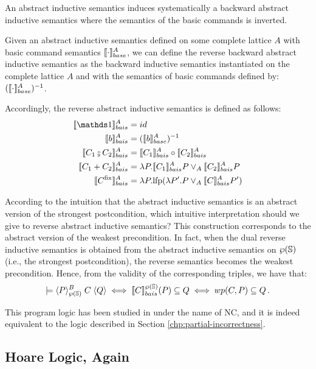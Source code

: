 \documentclass[
  10pt,       %
  twoside,    %
  a4paper,    %
  english,    %
  tikz,       %
  openright,  %
]{book}
\begin{document}
An abstract inductive semantics induces systematically a backward abstract
inductive semantics where the semantics of the basic commands is inverted.

\begin{definition}
  Given an abstract inductive semantics defined on some complete lattice $A$
  with basic command semantics $\bsem{\cdot}^A$, we can define the reverse
  backward abstract inductive semantics as the backward inductive semantics
  instantiated on the complete lattice $A$ and with the semantics of 
  basic commands defined by: 
  $(\bsem{\cdot}^A)^{-1}$.
\end{definition}

Accordingly, the reverse abstract inductive semantics is defined as follows:
\begin{align*}
  \asemback{\sskip}        &= id \\
  \asemback{b}             &= (\bsem{b}^A)^{-1} \\
  \asemback{C_1 \fcmp C_2} &= \asemback{C_1} \circ \asemback{C_2} \\
  \asemback{C_1 + C_2}     &= \lambda P . \asemback{C_1} P \join_A \asemback{C_2} P \\
  \asemback{C^\fix}        &= \lambda P . \lfp(\lambda P'. P \join_A \asemback{C} P')
\end{align*}

According to the intuition that the abstract inductive semantics is an abstract
version of the strongest postcondition, which intuitive interpretation should we give to
reverse abstract inductive semantics? This construction corresponds to the
abstract version of the weakest precondition. In fact, when the dual reverse
inductive semantics is obtained from the abstract inductive semantics on
$\pow{\states}$ (i.e., the strongest postcondition), the reverse semantics becomes
the weakest precondition.
Hence, from the validity of the corresponding triples, we have that: 
$$\models
\atripleback[\pow{\states}]{P}{C}{Q} \iff \asemback[\pow{\states}]{C}(P)
\subseteq Q \iff wp(C, P) \subseteq Q\, .$$

This program logic has been studied in \cite{Ascari24} under the name of NC, and
it is indeed equivalent to the logic described in Section
\ref{chp:partial-incorrectness}.

\subsection{Hoare Logic, Again}
\end{document}
